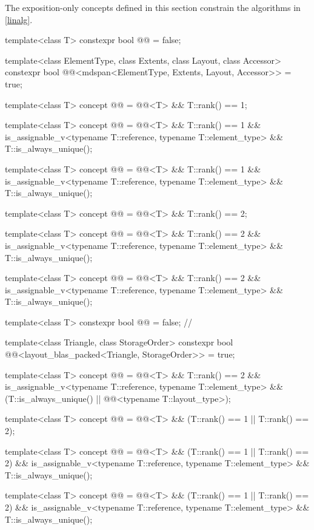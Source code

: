 \pnum
The exposition-only concepts defined in this section
constrain the algorithms in \ref{linalg}.
\begin{codeblock}
template<class T>
  constexpr bool @@ = false;

template<class ElementType, class Extents, class Layout, class Accessor>
  constexpr bool @@<mdspan<ElementType, Extents, Layout, Accessor>> = true;

template<class T>
  concept @@ =
    @@<T> && T::rank() == 1;

template<class T>
  concept @@ =
    @@<T> && T::rank() == 1 &&
    is_assignable_v<typename T::reference, typename T::element_type> && T::is_always_unique();

template<class T>
  concept @@ =
    @@<T> && T::rank() == 1 &&
    is_assignable_v<typename T::reference, typename T::element_type> && T::is_always_unique();

template<class T>
  concept @@ =
    @@<T> && T::rank() == 2;

template<class T>
  concept @@ =
    @@<T> && T::rank() == 2 &&
    is_assignable_v<typename T::reference, typename T::element_type> && T::is_always_unique();

template<class T>
  concept @@ =
    @@<T> && T::rank() == 2 &&
    is_assignable_v<typename T::reference, typename T::element_type> && T::is_always_unique();

template<class T>
  constexpr bool @@ = false;    // \expos

template<class Triangle, class StorageOrder>
  constexpr bool @@<layout_blas_packed<Triangle, StorageOrder>> = true;

template<class T>
  concept @@ =
    @@<T> && T::rank() == 2 &&
    is_assignable_v<typename T::reference, typename T::element_type> &&
    (T::is_always_unique() || @@<typename T::layout_type>);

template<class T>
  concept @@ =
    @@<T> && (T::rank() == 1 || T::rank() == 2);

template<class T>
  concept @@ =
    @@<T> && (T::rank() == 1 || T::rank() == 2) &&
    is_assignable_v<typename T::reference, typename T::element_type> && T::is_always_unique();

template<class T>
  concept @@ =
    @@<T> && (T::rank() == 1 || T::rank() == 2) &&
    is_assignable_v<typename T::reference, typename T::element_type> && T::is_always_unique();
\end{codeblock}

